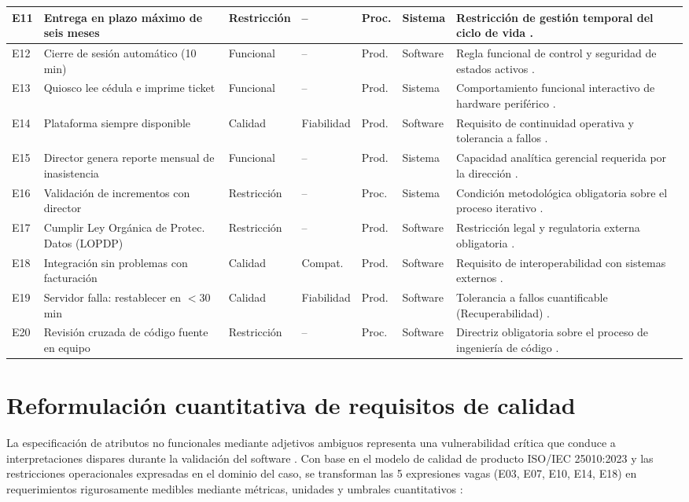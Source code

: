 \documentclass[11pt,a4paper]{article}
\begin{document}
\begin{longtable}{|p{0.6cm}|p{3.2cm}|p{1.6cm}|p{1.4cm}|p{1.2cm}|p{1.3cm}|X|}
		E11 & Entrega en plazo máximo de seis meses & Restricción & -- & Proc. & Sistema & Restricción de gestión temporal del ciclo de vida \cite{wiegers2013}. \\ \hline
		E12 & Cierre de sesión automático (10 min) & Funcional & -- & Prod. & Software & Regla funcional de control y seguridad de estados activos \cite{iso29148}. \\ \hline
		E13 & Quiosco lee cédula e imprime ticket & Funcional & -- & Prod. & Sistema & Comportamiento funcional interactivo de hardware periférico \cite{sommerville2019}. \\ \hline
		E14 & Plataforma siempre disponible & Calidad & Fiabilidad & Prod. & Software & Requisito de continuidad operativa y tolerancia a fallos \cite{iso25010}. \\ \hline
		E15 & Director genera reporte mensual de inasistencia & Funcional & -- & Prod. & Sistema & Capacidad analítica gerencial requerida por la dirección \cite{pohl2025}. \\ \hline
		E16 & Validación de incrementos con director & Restricción & -- & Proc. & Sistema & Condición metodológica obligatoria sobre el proceso iterativo \cite{wiegers2013}. \\ \hline
		E17 & Cumplir Ley Orgánica de Protec. Datos (LOPDP) & Restricción & -- & Prod. & Software & Restricción legal y regulatoria externa obligatoria \cite{ecuador2021}. \\ \hline
		E18 & Integración sin problemas con facturación & Calidad & Compat. & Prod. & Software & Requisito de interoperabilidad con sistemas externos \cite{iso25010}. \\ \hline
		E19 & Servidor falla: restablecer en $<30$ min & Calidad & Fiabilidad & Prod. & Software & Tolerancia a fallos cuantificable (Recuperabilidad) \cite{iso25010}. \\ \hline
		E20 & Revisión cruzada de código fuente en equipo & Restricción & -- & Proc. & Software & Directriz obligatoria sobre el proceso de ingeniería de código \cite{wiegers2013}. \\ \hline
	\end{longtable}
	\normalsize
	
	\section{Reformulación cuantitativa de requisitos de calidad}
	La especificación de atributos no funcionales mediante adjetivos ambiguos representa una vulnerabilidad crítica que conduce a interpretaciones dispares durante la validación del software \cite{wiegers2013, chung2000}. Con base en el modelo de calidad de producto ISO/IEC 25010:2023 y las restricciones operacionales expresadas en el dominio del caso, se transforman las 5 expresiones vagas (E03, E07, E10, E14, E18) en requerimientos rigurosamente medibles mediante métricas, unidades y umbrales cuantitativos \cite{iso25010, iso29148}:
	
\end{document}
